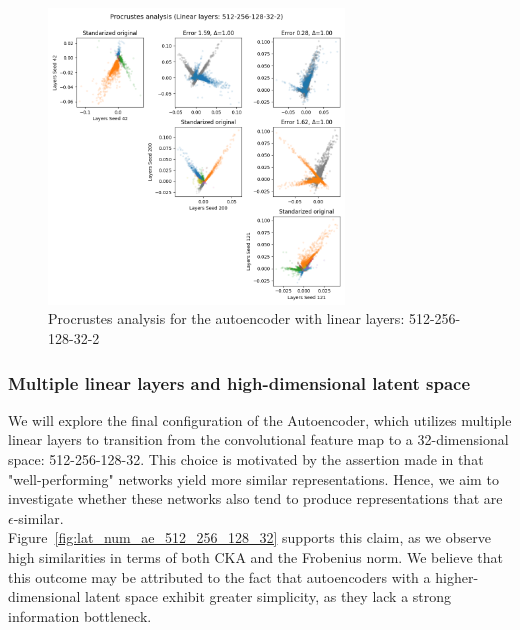 \documentclass[../main.tex]{subfiles}
\begin{document}
\begin{figure}[ht!]
    \centering
    \includegraphics[width=0.7\textwidth]{figures/rs/sim_ae/procrustes_512-256-128-32-2__42_200_121.png} 
    \caption{Procrustes analysis for the autoencoder with linear layers: 512-256-128-32-2}
    \label{fig:proc_ae_512_256_128_32_2}
\end{figure}


\subsubsection*{Multiple linear layers and high-dimensional latent space}
We will explore the final configuration of the Autoencoder, which utilizes multiple linear layers to transition from the convolutional feature map to a 32-dimensional space: 512-256-128-32. This choice is motivated by the assertion made in \cite{kornblith_similarity_2019} that "well-performing" networks yield more similar representations. Hence, we aim to investigate whether these networks also tend to produce representations that are $\epsilon$-similar.\\

Figure~\ref{fig:lat_num_ae_512_256_128_32} supports this claim, as we observe high similarities in terms of both CKA and the Frobenius norm. We believe that this outcome may be attributed to the fact that autoencoders with a higher-dimensional latent space exhibit greater simplicity, as they lack a strong information bottleneck.\\
\end{document}

